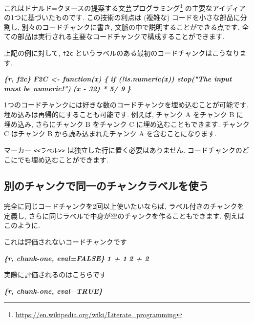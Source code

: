 \documentclass[
  11pt,
  lualatex,ja=standard,jafont=noto]{bxjsreport}
\newenvironment{Shaded}{\begin{snugshade}}{\end{snugshade}}
\newcommand{\InformationTok}[1]{\textcolor[rgb]{0.56,0.35,0.01}{\textbf{\textit{#1}}}}
\newcommand{\NormalTok}[1]{#1}
\renewcommand{\href}[2]{#2\footnote{\url{#1}}}
\begin{document}
これはドナルド=クヌースの提案する\href{https://en.wikipedia.org/wiki/Literate_programming}{文芸プログラミング} の主要なアイディアの1つに基づいたものです. この技術の利点は (複雑な) コードを小さな部品に分割し, 別々のコードチャンクに書き, 文脈の中で説明することができる点です. 全ての部品は実行される主要なコードチャンクで構成することができます.

上記の例に対して, \texttt{f2c} というラベルのある最初のコードチャンクはこうなります.

\begin{Shaded}
\begin{Highlighting}[]
\InformationTok{\textasciigrave{}\textasciigrave{}\textasciigrave{}\{r, f2c\}}
\InformationTok{F2C \textless{}{-} function(x) \{}
\InformationTok{  if (!is.numeric(x)) stop("The input must be numeric!")}
\InformationTok{  (x {-} 32) * 5/ 9}
\InformationTok{\}}
\InformationTok{\textasciigrave{}\textasciigrave{}\textasciigrave{}}
\end{Highlighting}
\end{Shaded}

1つのコードチャンクには好きな数のコードチャンクを埋め込むことが可能です. 埋め込みは再帰的にすることも可能です. 例えば, チャンク A をチャンク B に埋め込み, さらにチャンク B をチャンク C に埋め込むこともできます. チャンク C はチャンク B から読み込まれたチャンク A を含むことになります.

マーカー \texttt{\textless{}\textless{}ラベル\textgreater{}\textgreater{}} は独立した行に置く必要はありません. コードチャンクのどこにでも埋め込むことができます.

\hypertarget{same-label}{%
\subsection{別のチャンクで同一のチャンクラベルを使う}\label{same-label}}

完全に同じコードチャンクを2回以上使いたいならば, ラベル付きのチャンクを定義し, さらに同じラベルで中身が空のチャンクを作ることもできます. 例えばこのように.

\begin{Shaded}
\begin{Highlighting}[]
\NormalTok{これは評価されないコードチャンクです}

\InformationTok{\textasciigrave{}\textasciigrave{}\textasciigrave{}\{r, chunk{-}one, eval=FALSE\}}
\InformationTok{1 + 1}
\InformationTok{2 + 2}
\InformationTok{\textasciigrave{}\textasciigrave{}\textasciigrave{}}

\NormalTok{実際に評価されるのはこちらです}

\InformationTok{\textasciigrave{}\textasciigrave{}\textasciigrave{}\{r, chunk{-}one, eval=TRUE\}}
\InformationTok{\textasciigrave{}\textasciigrave{}\textasciigrave{}}
\end{Highlighting}
\end{Shaded}
\end{document}
